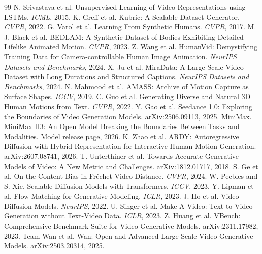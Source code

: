 \documentclass[10pt,twocolumn,letterpaper]{article}
\begin{document}
\begin{thebibliography}{99}\footnotesize
\setlength{\itemsep}{0pt}
\setlength{\parskip}{0pt}
 N. Srivastava et al. Unsupervised Learning of Video Representations using LSTMs. \emph{ICML}, 2015.
 K. Greff et al. Kubric: A Scalable Dataset Generator. \emph{CVPR}, 2022.
 G. Varol et al. Learning From Synthetic Humans. \emph{CVPR}, 2017.
 M. J. Black et al. BEDLAM: A Synthetic Dataset of Bodies Exhibiting Detailed Lifelike Animated Motion. \emph{CVPR}, 2023.
 Z. Wang et al. HumanVid: Demystifying Training Data for Camera-controllable Human Image Animation. \emph{NeurIPS Datasets and Benchmarks}, 2024.
 X. Ju et al. MiraData: A Large-Scale Video Dataset with Long Durations and Structured Captions. \emph{NeurIPS Datasets and Benchmarks}, 2024.
 N. Mahmood et al. AMASS: Archive of Motion Capture as Surface Shapes. \emph{ICCV}, 2019.
 C. Guo et al. Generating Diverse and Natural 3D Human Motions from Text. \emph{CVPR}, 2022.
 Y. Gao et al. Seedance 1.0: Exploring the Boundaries of Video Generation Models. arXiv:2506.09113, 2025.
 MiniMax. MiniMax H3: An Open Model Breaking the Boundaries Between Tasks and Modalities.
\href{https://www.minimax.io/blog/minimax-h3}{Model release page}, 2026.
 K. Zhao et al. ARDY: Autoregressive Diffusion with Hybrid Representation for Interactive Human Motion Generation. arXiv:2607.08741, 2026.
 T. Unterthiner et al. Towards Accurate Generative Models of Video: A New Metric and Challenges. arXiv:1812.01717, 2018.
 S. Ge et al. On the Content Bias in Fr\'echet Video Distance. \emph{CVPR}, 2024.
 W. Peebles and S. Xie. Scalable Diffusion Models with Transformers. \emph{ICCV}, 2023.
 Y. Lipman et al. Flow Matching for Generative Modeling. \emph{ICLR}, 2023.
 J. Ho et al. Video Diffusion Models. \emph{NeurIPS}, 2022.
 U. Singer et al. Make-A-Video: Text-to-Video Generation without Text-Video Data. \emph{ICLR}, 2023.
 Z. Huang et al. VBench: Comprehensive Benchmark Suite for Video Generative Models. arXiv:2311.17982, 2023.
 Team Wan et al. Wan: Open and Advanced Large-Scale Video Generative Models. arXiv:2503.20314, 2025.
\end{thebibliography}
\end{document}
